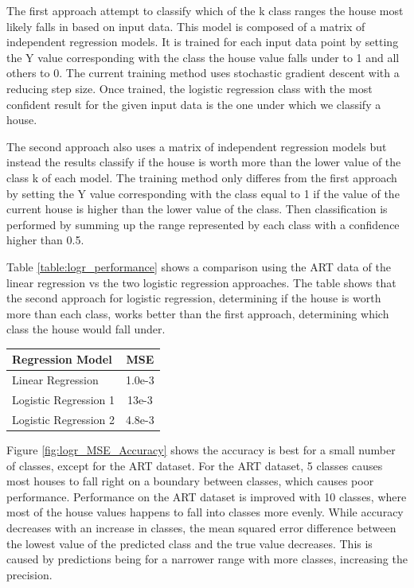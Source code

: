 \documentclass[10pt]{article}
\begin{document}
\begin{multicols}{2}
		The first approach attempt to classify which of the k class ranges the house most likely falls in based on input data. This model is composed of a matrix of independent regression models. It is trained for each input data point by setting the Y value corresponding with the class the house value falls under to 1 and all others to 0. The current training method uses stochastic gradient descent with a reducing step size. Once trained, the logistic regression class with the most confident result for the given input data is the one under which we classify a house.

	 	The second approach also uses a matrix of independent regression models but instead the results classify if the house is worth more than the lower value of the class k of each model. The training method only differes from the first approach by setting the Y value corresponding with the class equal to 1 if the value of the current house is higher than the lower value of the class. Then classification is performed by summing up the range represented by each class with a confidence higher than 0.5.

 		Table \ref{table:logr_performance} shows a comparison using the ART data of the linear regression vs the two logistic regression approaches. The table shows that the second approach for logistic regression, determining if the house is worth more than each class, works better than the first approach, determining which class the house would fall under.
		\begin{center}
	        \captionsetup{type=table}
			\begin{tabular}{l|c}
				Regression Model			& MSE \\
				\hline
				Linear Regression 			& 1.0e-3 \\
				Logistic Regression 1 		& 13e-3 \\
				Logistic Regression 2 		& 4.8e-3 \\
			\end{tabular}
			\label{table:logr_performance}        
			\setlength{\parindent}{15pt}
		\end{center}
	
		Figure \ref{fig:logr_MSE_Accuracy} shows the accuracy is best for a small number of classes, except for the ART dataset. For the ART dataset, 5 classes causes most houses to fall right on a boundary between classes, which causes poor performance. Performance on the ART dataset is improved with 10 classes, where most of the house values happens to fall into classes more evenly. While accuracy decreases with an increase in classes, the mean squared error difference between the lowest value of the predicted class and the true value decreases. This is caused by predictions being for a narrower range with more classes, increasing the precision.


\end{multicols}
\end{document}
